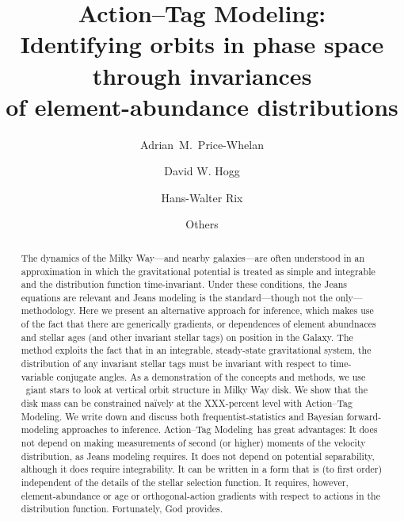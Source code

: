 \documentclass[modern]{aastex63}
\newcommand{\methodname}{Action--Tag Modeling}
\newcommand{\apogee}{\acronym{APOGEE}}
\begin{document}
\sloppy\sloppypar\raggedbottom\frenchspacing %
\graphicspath{ {figures/} }

\title{\textbf{%
\methodname:\\
Identifying orbits in phase space through invariances\\
of element-abundance distributions}}

\author[0000-0003-0872-7098]{Adrian~M.~Price-Whelan}

\author[0000-0003-2866-9403]{David W. Hogg}

\author[0000-0003-4996-9069]{Hans-Walter Rix}

\author{Others}

\begin{abstract}\noindent %
  The dynamics of the Milky Way---and nearby galaxies---are often
  understood in an approximation in which the gravitational potential
  is treated as simple and integrable and the distribution function
  time-invariant.
  Under these conditions, the Jeans equations are relevant and Jeans
  modeling is the standard---though not the only---methodology.
  Here we present an alternative approach for inference, which makes
  use of the fact that there are generically gradients, or dependences
  of element abundnaces and stellar ages (and other invariant stellar
  tags) on position in the Galaxy.
  The method exploits the fact that in an integrable, steady-state
  gravitational system, the distribution of any invariant stellar tags
  must be invariant with respect to time-variable conjugate angles.
  As a demonstration of the concepts and methods, we use
  \apogee\ giant stars to look at vertical orbit structure in Milky
  Way disk.
  We show that the disk mass can be constrained na\"ively at the
  XXX-percent level with \methodname.
  We write down and discuss both frequentist-statistics and Bayesian
  forward-modeling approaches to inference.
  \methodname\ has great advantages:
  It does not depend on making measurements of second (or higher)
  moments of the velocity distribution, as Jeans modeling
  requires.
  It does not depend on potential separability, although it does require
  integrability.
  It can be written in a form that is (to first order) independent
  of the details of the stellar selection function.
  It requires, however, element-abundance or age or orthogonal-action
  gradients with respect to actions in the distribution function.
  Fortunately, God provides.
\end{abstract}
\end{document}
